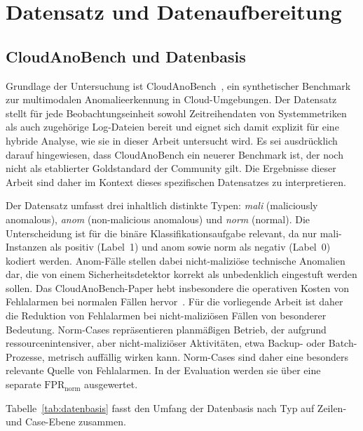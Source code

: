 
\section{Datensatz und Datenaufbereitung}
\label{sec:data_preparation}

\subsection{CloudAnoBench und Datenbasis}

Grundlage der Untersuchung ist CloudAnoBench~\cite{zou2025cloudanobench}, ein synthetischer Benchmark zur multimodalen Anomalieerkennung in Cloud-Umgebungen. Der Datensatz stellt für jede Beobachtungseinheit sowohl Zeitreihendaten von Systemmetriken als auch zugehörige Log-Dateien bereit und eignet sich damit explizit für eine hybride Analyse, wie sie in dieser Arbeit untersucht wird. Es sei ausdrücklich darauf hingewiesen, dass CloudAnoBench ein neuerer Benchmark ist, der noch nicht als etablierter Goldstandard der Community gilt. Die Ergebnisse dieser Arbeit sind daher im Kontext dieses spezifischen Datensatzes zu interpretieren.

Der Datensatz umfasst drei inhaltlich distinkte Typen: \emph{mali} (maliciously anomalous), \emph{anom} (non-malicious anomalous) und \emph{norm} (normal). Die Unterscheidung ist für die binäre Klassifikationsaufgabe relevant, da nur mali-Instanzen als positiv (Label~1) und anom sowie norm als negativ (Label~0) kodiert werden. Anom-Fälle stellen dabei nicht-maliziöse technische Anomalien dar, die von einem Sicherheitsdetektor korrekt als unbedenklich eingestuft werden sollen. Das CloudAnoBench-Paper hebt insbesondere die operativen Kosten von
Fehlalarmen bei normalen Fällen hervor~\cite{zou2025cloudanobench}. Für die
vorliegende Arbeit ist daher die Reduktion von Fehlalarmen bei nicht-maliziösen
Fällen von besonderer Bedeutung. Norm-Cases repräsentieren planmäßigen Betrieb, der aufgrund ressourcenintensiver, aber nicht-maliziöser Aktivitäten, etwa Backup- oder Batch-Prozesse, metrisch auffällig wirken kann. Norm-Cases sind daher eine besonders relevante Quelle von Fehlalarmen. In der Evaluation werden sie über eine separate $\text{FPR}_{\text{norm}}$ ausgewertet.

Tabelle~\ref{tab:datenbasis} fasst den Umfang der Datenbasis nach Typ auf Zeilen- und Case-Ebene zusammen.

